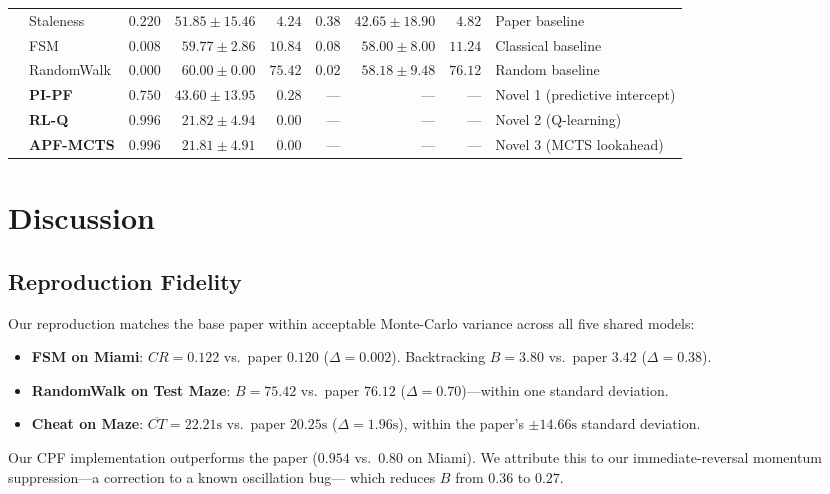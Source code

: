 \documentclass[conference,onecolumn]{IEEEtran}
\begin{document}
\begin{table}[!t]
\begin{tabular}{l l r r r r r r l}
 & Staleness
   & $0.220$ & $51.85\pm15.46$ & $4.24$
   & $0.38$  & $42.65\pm18.90$ & $4.82$ & Paper baseline \\
 & FSM
   & $0.008$ & $59.77\pm2.86$  & $10.84$
   & $0.08$  & $58.00\pm8.00$  & $11.24$& Classical baseline \\
 & RandomWalk
   & $0.000$ & $60.00\pm0.00$  & $75.42$
   & $0.02$  & $58.18\pm9.48$  & $76.12$& Random baseline \\
 & \textbf{PI-PF}
   & $\mathbf{0.750}$ & $\mathbf{43.60\pm13.95}$ & $\mathbf{0.28}$
   & --- & --- & --- & Novel 1 (predictive intercept) \\
 & \textbf{RL-Q}
   & $\mathbf{0.996}$ & $\mathbf{21.82\pm4.94}$  & $\mathbf{0.00}$
   & --- & --- & --- & Novel 2 (Q-learning) \\
 & \textbf{APF-MCTS}
   & $\mathbf{0.996}$ & $\mathbf{21.81\pm4.91}$  & $\mathbf{0.00}$
   & --- & --- & --- & Novel 3 (MCTS lookahead) \\
\bottomrule
\end{tabular}
\end{table}

\section{Discussion}

\subsection{Reproduction Fidelity}
Our reproduction matches the base paper within acceptable
Monte-Carlo variance across all five shared models:
\begin{itemize}
  \item \textbf{FSM on Miami}: $CR = 0.122$ vs.\ paper $0.120$
        ($\Delta = 0.002$). Backtracking $B = 3.80$ vs.\
        paper $3.42$ ($\Delta = 0.38$).
  \item \textbf{RandomWalk on Test Maze}: $B = 75.42$ vs.\
        paper $76.12$ ($\Delta = 0.70$)---within one standard
        deviation.
  \item \textbf{Cheat on Maze}: $\overline{CT} = 22.21\text{s}$
        vs.\ paper $20.25\text{s}$ ($\Delta = 1.96\text{s}$),
        within the paper's $\pm14.66\text{s}$ standard deviation.
\end{itemize}

Our CPF implementation outperforms the paper ($0.954$ vs.\
$0.80$ on Miami). We attribute this to our immediate-reversal
momentum suppression---a correction to a known oscillation bug---
which reduces $B$ from $0.36$ to $0.27$.
\end{document}
